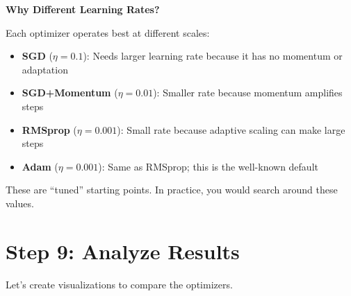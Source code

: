 \documentclass[../../main.tex]{subfiles}
\begin{document}
\begin{keyconcept}
\textbf{Why Different Learning Rates?}

Each optimizer operates best at different scales:
\begin{itemize}
    \item \textbf{SGD} ($\eta = 0.1$): Needs larger learning rate because it has no momentum or adaptation
    \item \textbf{SGD+Momentum} ($\eta = 0.01$): Smaller rate because momentum amplifies steps
    \item \textbf{RMSprop} ($\eta = 0.001$): Small rate because adaptive scaling can make large steps
    \item \textbf{Adam} ($\eta = 0.001$): Same as RMSprop; this is the well-known default
\end{itemize}

These are ``tuned'' starting points. In practice, you would search around these values.
\end{keyconcept}

\section{Step 9: Analyze Results}
\label{sec:capstone-analysis}

Let's create visualizations to compare the optimizers.
\end{document}
